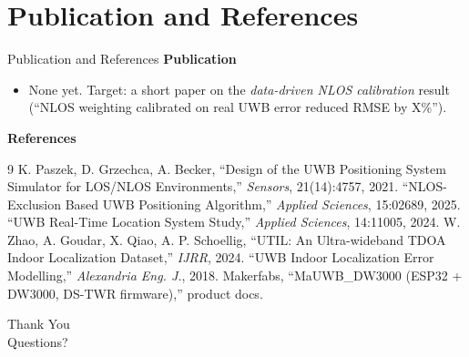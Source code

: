 \documentclass[aspectratio=169,10pt]{beamer}
\begin{document}
\section{Publication and References}
\begin{frame}{Publication and References}
  \textbf{Publication}
  \begin{itemize}\small
    \item None yet. Target: a short paper on the \emph{data-driven NLOS calibration}
          result (``NLOS weighting calibrated on real UWB error reduced RMSE by X\%'').
  \end{itemize}
  \vspace{4pt}
  \textbf{References}
  \begin{thebibliography}{9}\footnotesize
     K. Paszek, D. Grzechca, A. Becker, ``Design of the UWB Positioning System Simulator for LOS/NLOS Environments,'' \emph{Sensors}, 21(14):4757, 2021.
     ``NLOS-Exclusion Based UWB Positioning Algorithm,'' \emph{Applied Sciences}, 15:02689, 2025.
     ``UWB Real-Time Location System Study,'' \emph{Applied Sciences}, 14:11005, 2024.
     W. Zhao, A. Goudar, X. Qiao, A. P. Schoellig, ``UTIL: An Ultra-wideband TDOA Indoor Localization Dataset,'' \emph{IJRR}, 2024.
     ``UWB Indoor Localization Error Modelling,'' \emph{Alexandria Eng. J.}, 2018.
     Makerfabs, ``MaUWB\_DW3000 (ESP32 + DW3000, DS-TWR firmware),'' product docs.
  \end{thebibliography}
\end{frame}

{
\begin{frame}[plain]
  \begin{center}
    {\Huge\color{structure}Thank You}\\[8pt]
    {\large Questions?}
  \end{center}
\end{frame}}
\end{document}
